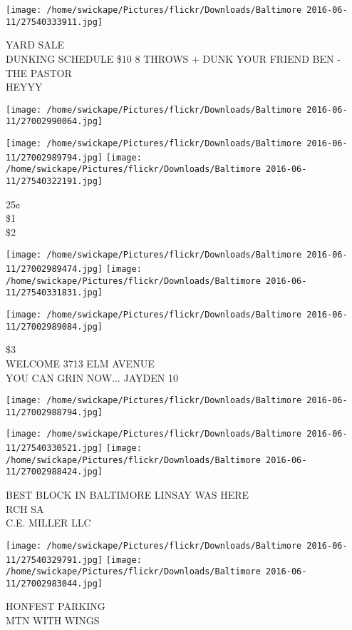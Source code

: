 \documentclass[10pt,letterpaper]{article}
\begin{document}
\vspace{0.25in}
\texttt{[image: /home/swickape/Pictures/flickr/Downloads/Baltimore 2016-06-11/27540333911.jpg]}

YARD SALE\\
DUNKING SCHEDULE \$10 8 THROWS + DUNK YOUR FRIEND BEN {-} THE PASTOR\\
HEYYY\\
\pagebreak

\texttt{[image: /home/swickape/Pictures/flickr/Downloads/Baltimore 2016-06-11/27002990064.jpg]}

\vspace{0.25in}
\texttt{[image: /home/swickape/Pictures/flickr/Downloads/Baltimore 2016-06-11/27002989794.jpg]}
\texttt{[image: /home/swickape/Pictures/flickr/Downloads/Baltimore 2016-06-11/27540322191.jpg]}

25¢\\
\$1\\
\$2\\
\pagebreak

\texttt{[image: /home/swickape/Pictures/flickr/Downloads/Baltimore 2016-06-11/27002989474.jpg]}
\texttt{[image: /home/swickape/Pictures/flickr/Downloads/Baltimore 2016-06-11/27540331831.jpg]}

\vspace{0.25in}
\texttt{[image: /home/swickape/Pictures/flickr/Downloads/Baltimore 2016-06-11/27002989084.jpg]}

\$3\\
WELCOME 3713 ELM AVENUE\\
YOU CAN GRIN NOW... JAYDEN 10\\
\pagebreak

\texttt{[image: /home/swickape/Pictures/flickr/Downloads/Baltimore 2016-06-11/27002988794.jpg]}

\vspace{0.25in}
\texttt{[image: /home/swickape/Pictures/flickr/Downloads/Baltimore 2016-06-11/27540330521.jpg]}
\texttt{[image: /home/swickape/Pictures/flickr/Downloads/Baltimore 2016-06-11/27002988424.jpg]}

BEST BLOCK IN BALTIMORE LINSAY WAS HERE\\
RCH SA\\
C.E. MILLER LLC\\
\pagebreak

\texttt{[image: /home/swickape/Pictures/flickr/Downloads/Baltimore 2016-06-11/27540329791.jpg]}
\texttt{[image: /home/swickape/Pictures/flickr/Downloads/Baltimore 2016-06-11/27002983044.jpg]}

HONFEST PARKING\\
MTN WITH WINGS\\
\pagebreak
\end{document}
